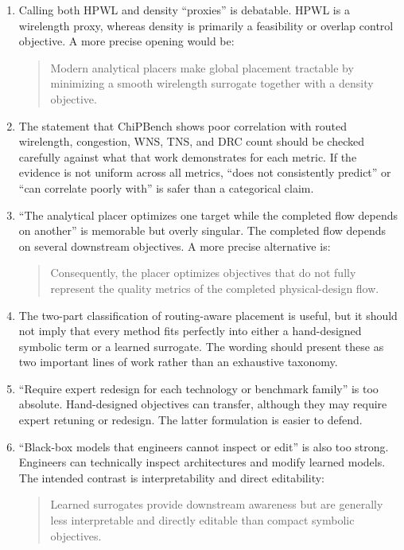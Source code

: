 \documentclass[11pt]{article}
\begin{document}
\begin{enumerate}
  \item Calling both HPWL and density ``proxies'' is debatable. HPWL is a
  wirelength proxy, whereas density is primarily a feasibility or overlap
  control objective. A more precise opening would be:

  \begin{quote}
  Modern analytical placers make global placement tractable by minimizing a
  smooth wirelength surrogate together with a density objective.
  \end{quote}

  \item The statement that ChiPBench shows poor correlation with routed
  wirelength, congestion, WNS, TNS, and DRC count should be checked carefully
  against what that work demonstrates for each metric. If the evidence is not
  uniform across all metrics, ``does not consistently predict'' or ``can
  correlate poorly with'' is safer than a categorical claim.

  \item ``The analytical placer optimizes one target while the completed flow
  depends on another'' is memorable but overly singular. The completed flow
  depends on several downstream objectives. A more precise alternative is:

  \begin{quote}
  Consequently, the placer optimizes objectives that do not fully represent
  the quality metrics of the completed physical-design flow.
  \end{quote}

  \item The two-part classification of routing-aware placement is useful, but
  it should not imply that every method fits perfectly into either a
  hand-designed symbolic term or a learned surrogate. The wording should
  present these as two important lines of work rather than an exhaustive
  taxonomy.

  \item ``Require expert redesign for each technology or benchmark family'' is
  too absolute. Hand-designed objectives can transfer, although they may
  require expert retuning or redesign. The latter formulation is easier to
  defend.

  \item ``Black-box models that engineers cannot inspect or edit'' is also too
  strong. Engineers can technically inspect architectures and modify learned
  models. The intended contrast is interpretability and direct editability:

  \begin{quote}
  Learned surrogates provide downstream awareness but are generally less
  interpretable and directly editable than compact symbolic objectives.
  \end{quote}
\end{enumerate}
\end{document}
